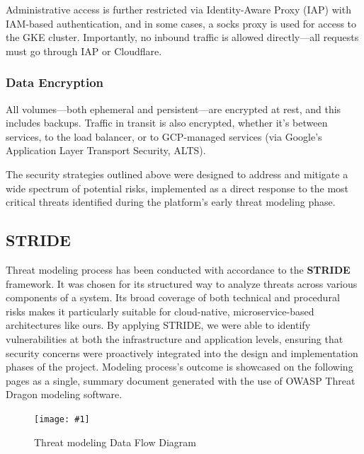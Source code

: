 \documentclass[11pt,a4paper]{article}
\newcommand{\fullpageimage}[1]{%
  \begin{adjustwidth*}{-0.1666\paperwidth}{-0.1666\paperwidth}
    \noindent\texttt{[image: \#1]}
  \end{adjustwidth*}
}
\begin{document}
Administrative access is further restricted via Identity-Aware Proxy (IAP) with IAM-based authentication, and in some cases, a socks proxy is used for access to the GKE cluster. Importantly, no inbound traffic is allowed directly—all requests must go through IAP or Cloudflare.

\subsubsection{Data Encryption}

All volumes—both ephemeral and persistent—are encrypted at rest, and this includes backups. Traffic in transit is also encrypted, whether it’s between services, to the load balancer, or to GCP-managed services (via Google’s Application Layer Transport Security, ALTS).

The security strategies outlined above were designed to address and mitigate a wide spectrum of potential risks, implemented as a direct response to the most critical threats identified during the platform's early threat modeling phase.

\subsection{STRIDE}

Threat modeling process has been conducted with accordance to the \textbf{STRIDE} framework.  
It was chosen for its structured way to analyze threats across various components of a system. Its broad coverage of both technical and procedural risks makes it particularly suitable for cloud-native, microservice-based architectures like ours. By applying STRIDE, we were able to identify vulnerabilities at both the infrastructure and application levels, ensuring that security concerns were proactively integrated into the design and implementation phases of the project.
Modeling process's outcome is showcased on the following pages as a single, summary document generated with the use of OWASP Threat Dragon modeling software. 

\begin{figure}[H]
  \centering
\fullpageimage{DFD-threat-model.png}
  \caption{Threat modeling Data Flow Diagram}
  \label{fig:DFD-threat-model}
\end{figure}


\end{document}
